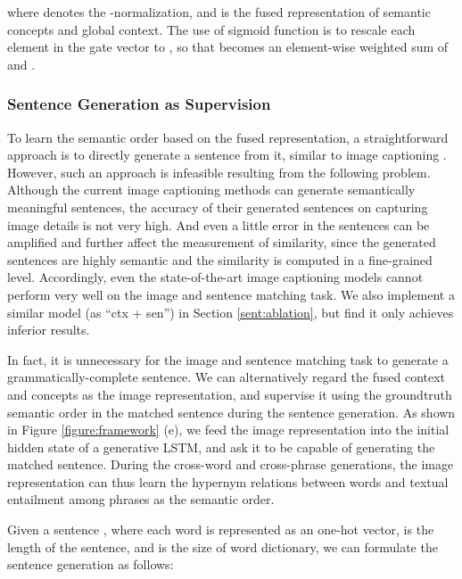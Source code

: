 \documentclass[10pt,twocolumn,letterpaper]{article}
\begin{document}
where  denotes the -normalization,
and  is the fused representation of semantic concepts and global context.
The use of sigmoid function  is to rescale each element in the gate vector  to ,
so that  becomes an element-wise weighted sum of
 and .


\vspace{-3mm}
\subsubsection{Sentence Generation as Supervision} \label{sent:order}
\vspace{-1mm}
To learn the semantic order based on the fused representation,
a straightforward approach is to directly generate a sentence from it,
similar to image captioning \cite{wu2016value}.
However, such an approach is infeasible resulting from the following problem.
Although the current image captioning methods can
generate semantically meaningful sentences,
the accuracy of their generated sentences on capturing image details is not very high.
And even a little error in the sentences can be amplified
and further affect the measurement of similarity,
since the generated sentences are highly semantic and the similarity is computed in a fine-grained level.
Accordingly, even the state-of-the-art image captioning models
\cite{vinyals2017show,donahue2015long,mao2014explain}
cannot perform very well on the image and sentence matching task.
We also implement a similar model (as ``ctx + sen'') in Section \ref{sent:ablation},
but find it only achieves inferior results.



In fact, it is unnecessary for the image and sentence matching task
to generate a grammatically-complete sentence.
We can alternatively regard the fused context and concepts as the image representation,
and supervise it using the groundtruth semantic order in the matched sentence
during the sentence generation.
As shown in Figure \ref{figure:framework} (e),
we feed the image representation into the initial hidden state
of a generative LSTM, and ask it to be capable of generating the matched sentence.
During the cross-word and cross-phrase generations,
the image representation can thus learn
the hypernym relations between words and textual entailment among phrases
as the semantic order.



Given a sentence
,
where each word  is represented as an one-hot vector,
 is the length of the sentence, and  is the size of word dictionary,
we can formulate the sentence generation as follows:
\end{document}
